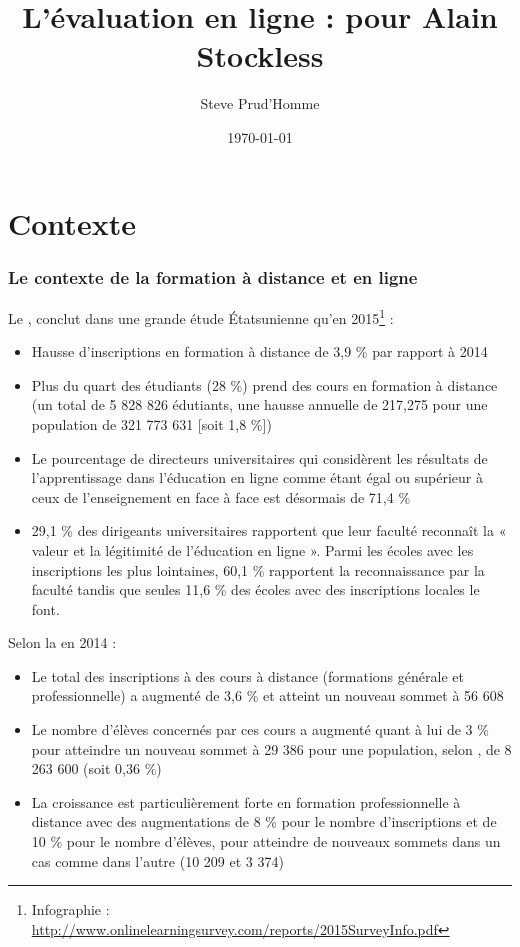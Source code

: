 \documentclass[aspectratio=169]{beamer}
\begin{document}
	\title{L'évaluation en ligne : pour Alain Stockless} 
	\author{Steve Prud'Homme} 
	\date{\today} 

	
	\frame{\titlepage} 
	
	\section{Contexte} 
		\begin{frame}[allowframebreaks]
			\frametitle{Le contexte de la formation à distance et en ligne}
			Le \citet{OLC2015a}, conclut dans une grande étude Étatsunienne qu'en 2015\footnote{Infographie : \url {http://www.onlinelearningsurvey.com/reports/2015SurveyInfo.pdf} } :
			\begin {itemize}
				\item Hausse d'inscriptions en formation à distance de 3,9 \% par rapport à 2014
				\item Plus du quart des étudiants (28 \%) prend des cours en formation à distance (un  total de 5 828 826 édutiants, une hausse annuelle de 217,275  pour une population de 321 773 631 [soit 1,8  \%])
				\item Le pourcentage de directeurs universitaires qui considèrent les résultats de l'apprentissage dans l'éducation en ligne comme étant égal ou supérieur à ceux de l'enseignement en face à face est désormais de 71,4 \%
				\item 29,1 \% des dirigeants universitaires rapportent que leur faculté reconnaît la « valeur et la légitimité de l'éducation en ligne ». Parmi les écoles avec les inscriptions les plus lointaines, 60,1 \% rapportent la reconnaissance par la faculté tandis que seules 11,6 \% des écoles avec des inscriptions locales le font.
			\end{itemize}
			\framebreak
			Selon la \citet{sofad2015a} en 2014 : 
			\begin {itemize}
				\item Le total des inscriptions à des cours à distance (formations générale et professionnelle) a augmenté de 3,6 \% et atteint un nouveau sommet à 56 608
				\item Le nombre d’élèves concernés par ces cours a augmenté quant à lui de 3 \% pour atteindre un nouveau sommet à 29 386 pour une population, selon \citet{is2015a}, de 8 263 600 (soit 0,36 \%)
				\item La croissance est particulièrement forte en formation professionnelle à distance avec des augmentations de 8 \% pour le nombre d’inscriptions et de 10 \% pour le nombre d’élèves, pour atteindre de nouveaux sommets dans un cas comme dans l’autre (10 209 et 3 374)
			\end{itemize}
		\end{frame}
		
\end{document}
